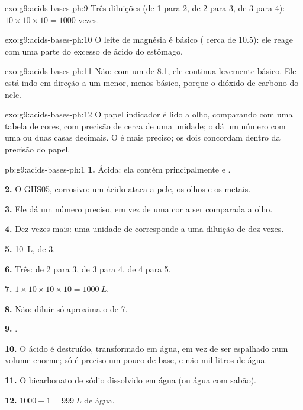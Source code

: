 \begin{solution}{exo:g9:acids-bases-ph:9}
Três diluições (de 1 para 2, de 2 para 3, de 3 para 4): $10 \times 10 \times 10 =
1000$ vezes.
\end{solution}

\begin{solution}{exo:g9:acids-bases-ph:10}
O leite de magnésia é básico ( cerca de 10.5): ele reage com uma parte
do excesso de ácido do estômago.
\end{solution}

\begin{solution}{exo:g9:acids-bases-ph:11}
Não: com um  de 8.1, ele continua levemente básico. Ele está indo em
direção a um  menor, menos básico, porque o dióxido de carbono do 
 nele.
\end{solution}

\begin{solution}{exo:g9:acids-bases-ph:12}
O papel indicador é lido a olho, comparando com uma tabela de cores, com
precisão de cerca de uma unidade; o  dá um número com uma ou duas
casas decimais. O  é mais preciso; os dois concordam dentro da
precisão do papel.
\end{solution}

\begin{solution}{pb:g9:acids-bases-ph:1}
\textbf{1.} Ácida: ela contém principalmente   e
.

\textbf{2.} O GHS05, corrosivo: um ácido ataca a pele, os olhos e os
metais.

\textbf{3.} Ele dá um número preciso, em vez de uma cor a ser comparada a
olho.

\textbf{4.} Dez vezes mais: uma unidade de  corresponde a uma diluição
de dez vezes.

\textbf{5.} \qty{10}{L}, de  3.

\textbf{6.} Três: de  2 para 3, de 3 para 4, de 4 para 5.

\textbf{7.} $1 \times 10 \times 10 \times 10 = \qty{1000}{L}$.

\textbf{8.} Não: diluir só aproxima o  de 7.

\textbf{9.} .

\textbf{10.} O ácido é destruído, transformado em água, em vez de ser
espalhado num volume enorme; só é preciso um pouco de base, e não mil
litros de água.

\textbf{11.} O bicarbonato de sódio dissolvido em água (ou água com
sabão).

\textbf{12.} $1000 - 1 = \qty{999}{L}$ de água.
\end{solution}
